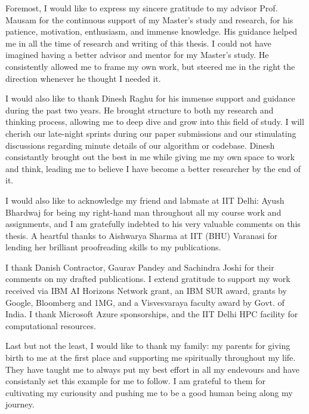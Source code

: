 Foremost, I would like to express my sincere gratitude to my advisor Prof. Mausam for the continuous support of my Master's study and research, for his patience, motivation, enthusiasm, and immense knowledge. His guidance helped me in all the time of research and writing of this thesis. I could not have imagined having a better advisor and mentor for my Master's study. He consistently allowed me to frame my own work, but steered me in the right the direction whenever he thought I needed it.

I would also like to thank Dinesh Raghu for his immense support and guidance during the past two years. He brought structure to both my research and thinking process, allowing me to deep dive and grow into this field of study. I will cherish our late-night sprints during our paper submissions and our stimulating discussions regarding minute details of our algorithm or codebase. Dinesh consistantly brought out the best in me while giving me my own space to work and think, leading me to believe I have become a better researcher by the end of it.

I would also like to acknowledge my friend and labmate at IIT Delhi: Ayush Bhardwaj for being my right-hand man throughout all my course work and assignments, and I am gratefully indebted to his very valuable comments on this thesis. A heartful thanks to Aishwarya Sharma at IIT (BHU) Varanasi for lending her brilliant proofreading skills to my publications.

I thank Danish Contractor, Gaurav Pandey and Sachindra Joshi for their comments on my drafted publications. I extend gratitude to support my work received via IBM AI Horizons Network grant, an IBM SUR award, grants by Google, Bloomberg and 1MG, and a Visvesvaraya faculty award by Govt. of India. I thank Microsoft Azure sponsorships, and the IIT Delhi HPC facility for computational resources.

Last but not the least, I would like to thank my family: my parents for giving birth to me at the first place and supporting me spiritually throughout my life. They have taught me to always put my best effort in all my endevours and have consistanly set this example for me to follow. I am grateful to them for cultivating my curiousity and pushing me to be a good human being along my journey.